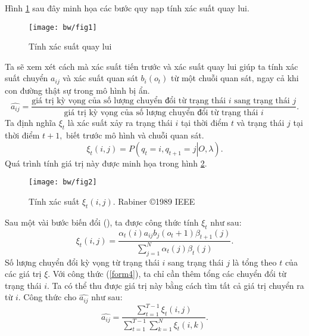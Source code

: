 Hình \ref{bw_fig1} sau đây minh họa các bước quy nạp tính xác suất quay lui.
\begin{figure}[H]
\begin{center}
\texttt{[image: bw/fig1]}
\end{center}
\caption{Tính xác suất quay lui \label{bw_fig1}}
\end{figure}
Ta sẽ xem xét cách mà xác suất tiến trước và xác suất quay lui giúp ta tính xác suất chuyển $a_{ij}$ và xác suất quan sát $b_i \left( {o_t} \right)$ từ một chuỗi quan sát, ngay cả khi con đường thật sự trong mô hình bị ẩn.\\
\begin{equation}
\widehat {{a_{ij}}} = \frac{\text{giá trị kỳ vọng của số lượng chuyển đổi từ trạng thái } i \text{ sang trạng thái } j}{\text{giá trị kỳ vọng của số lượng chuyển đổi từ trạng thái } i}.
\label{form4}
\end{equation}
Ta định nghĩa ${\xi _t}$ là xác suất xảy ra trạng thái $i$ tại thời điểm $t$ và trạng thái $j$ tại thời điểm $t + 1,$ biết trước mô hình và chuỗi quan sát.
\begin{equation}
{\xi _t \left( {i, j} \right)} = P\left( {\left. {{q_t} = i,{q_{t + 1}} = j} \right|O,\lambda } \right).
\end{equation}
Quá trình tính giá trị này được minh họa trong hình \ref{bw_fig2}.
\begin{figure}[H]
\begin{center}
\texttt{[image: bw/fig2]}
\end{center}
\caption{Tính xác suất $\xi_t \left( {i, j} \right).$ Rabiner \copyright 1989 IEEE \label{bw_fig2}}
\end{figure}
Sau một vài bước biến đổi (\cite{hmm2021}), ta được công thức tính $\xi_t$ như sau:
\begin{equation}
{\xi _t}\left( {i,j} \right) = \frac{{{\alpha _t}\left( i \right){a_{ij}}{b_j}\left( {{o_t} + 1} \right){\beta _{t + 1}}\left( j \right)}}{{\sum\limits_{j = 1}^N {{\alpha _t}\left( j \right){\beta _t}\left( j \right)} }}.
\end{equation}
Số lượng chuyển đổi kỳ vọng từ trạng thái $i$ sang trạng thái $j$ là tổng theo $t$ của các giá trị $\xi.$ Với công thức (\ref{form4}), ta chỉ cần thêm tổng các chuyển đổi từ trạng thái $i.$ Ta có thể thu được giá trị này bằng cách tìm tất cả giá trị chuyển ra từ $i.$ Công thức cho $\widehat{a_{ij}}$ như sau:
\begin{equation}
\widehat {{a_{ij}}} = \frac{{\sum\limits_{t = 1}^{T - 1} {{\xi _t}\left( {i,j} \right)} }}{{\sum\limits_{t = 1}^{T - 1} {\sum\limits_{k = 1}^N {{\xi _t}\left( {i,k} \right)} } }}.
\label{form5}
\end{equation}
